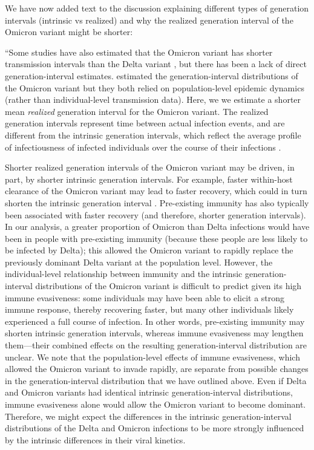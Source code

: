 \documentclass[12pt]{article}
\begin{document}
We have now added text to the discussion explaining different types of generation intervals (intrinsic vs realized) and why the realized generation interval of the Omicron variant might be shorter:

``Some studies have also estimated that the Omicron variant has shorter transmission intervals than the Delta variant \citep{abbott2022test,kremer2022observed,song2022serial}, but there has been a lack of direct generation-interval estimates.
\cite{ito2022estimating,selby2022generation} estimated the generation-interval distributions of the Omicron variant but they both relied on population-level epidemic dynamics (rather than individual-level transmission data).
Here, we we estimate a shorter mean \emph{realized} generation interval for the Omicron variant.
The realized generation intervals represent time between actual infection events, and are different from the intrinsic generation intervals, which reflect the average profile of infectiousness of infected individuals over the course of their infections \citep{champredon2015intrinsic}.

Shorter realized generation intervals of the Omicron variant may be driven, in part, by shorter intrinsic generation intervals.
For example, faster within-host clearance of the Omicron variant \citep{hay2022viral} may lead to faster recovery, which could in turn shorten the intrinsic generation interval \citep{roberts2007model}.
Pre-existing immunity has also typically been associated with faster recovery \citep{kissler2021viral} (and therefore, shorter generation intervals).
In our analysis, a greater proportion of Omicron than Delta infections would have been in people with pre-existing immunity (because these people are less likely to be infected by Delta);
this allowed the Omicron variant to rapidly replace the previously dominant Delta variant at the population level.
However, the individual-level relationship between immunity and the intrinsic generation-interval distributions of the Omicron variant is difficult to predict given its high immune evasiveness:
some individuals may have been able to elicit a strong immune response, thereby recovering faster, but many other individuals likely experienced a full course of infection.
In other words, pre-existing immunity may shorten intrinsic generation intervals, whereas immune evasiveness may lengthen them---their combined effects on the resulting generation-interval distribution are unclear.
We note that the population-level effects of immune evasiveness, which allowed the Omicron variant to invade rapidly, are separate from possible changes in the generation-interval distribution that we have outlined above.
Even if Delta and Omicron variants had identical intrinsic generation-interval distributions, immune evasiveness alone would allow the Omicron variant to become dominant.
Therefore, we might expect the differences in the intrinsic generation-interval distributions of the Delta and Omicron infections to be more strongly influenced by the intrinsic differences in their viral kinetics.
\end{document}
